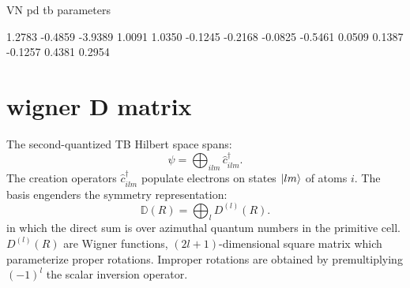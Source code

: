 \documentclass[twocolumn,showpacs,preprintnumbers,superscriptaddress,prb,floatfix,aps,10pt]{revtex4-1}
\newcommand*{\wignerD}{\mathbb{D}(R)}
\newcommand*{\wignerDl}{D^{(l)}(R)}
\begin{document}


\clearpage

VN pd tb parameters

    1.2783
   -0.4859
   -3.9389
    1.0091
    1.0350
   -0.1245
   -0.2168
   -0.0825
   -0.5461
    0.0509
    0.1387
   -0.1257
    0.4381
    0.2954




\appendix

%
%
\section{wigner D matrix} 
\label{appendix:wigner}

The second-quantized TB Hilbert space spans:
%
\begin{equation}
\psi = \bigoplus_{ilm} \hat{c}_{ilm}^\dag.
\end{equation}
%
The creation operators $\hat{c}_{ilm}^\dag$ populate electrons on states $\ket{lm}$ of atoms $i$. The basis engenders the symmetry representation:
%
\begin{equation}
\wignerD = \bigoplus_l \wignerDl.
\end{equation}
%
in which the direct sum is over azimuthal quantum numbers in the primitive cell. $\wignerDl$ are Wigner functions, $(2l+1)$-dimensional square matrix which parameterize proper rotations. %
Improper rotations are obtained by premultiplying $(-1)^l$ the scalar inversion operator. \cite{sharma_general_1979,el-batanouny_symmetry_2008} 
\end{document}
